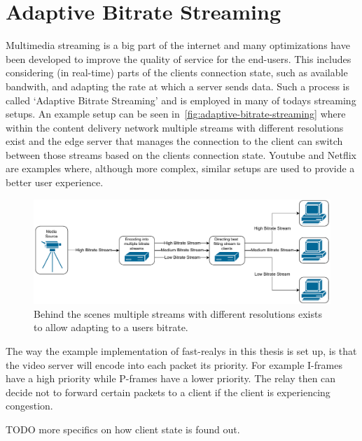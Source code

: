 \section{Adaptive Bitrate Streaming}\label{sec:adaptive_bitrate_streaming}
Multimedia streaming is a big part of the internet and many optimizations have
been developed to improve the quality of service for the end-users.
This includes considering (in real-time) parts of the clients connection state, 
such as available bandwith, and adapting the rate at which a server sends data.
Such a process is called `Adaptive Bitrate Streaming' and is employed in many 
of todays streaming setups.
An example setup can be seen in~\autoref{fig:adaptive-bitrate-streaming} where
within the content delivery network multiple streams with different resolutions
exist and the edge server that manages the connection to the client can switch
between those streams based on the clients connection state.
Youtube and Netflix are examples where, although more complex, similar setups
are used to provide a better user experience. 

\begin{figure}[htbp]
    \centering
    \includegraphics[width=\textwidth]{figures/02_background/adaptive-bitrate-streaming.drawio.pdf}
    \caption[Adaptive streaming schematic]{Behind the scenes multiple streams with different
    resolutions exists to allow adapting to a users bitrate.}\label{fig:adaptive-bitrate-streaming}
\end{figure}

The way the example implementation of fast-realys in this thesis is set up,
is that the video server will encode into each packet its priority.
For example I-frames have a high priority while P-frames have a lower
priority.
The relay then can decide not to forward certain packets to a client if
the client is experiencing congestion.

TODO more specifics on how client state is found out.